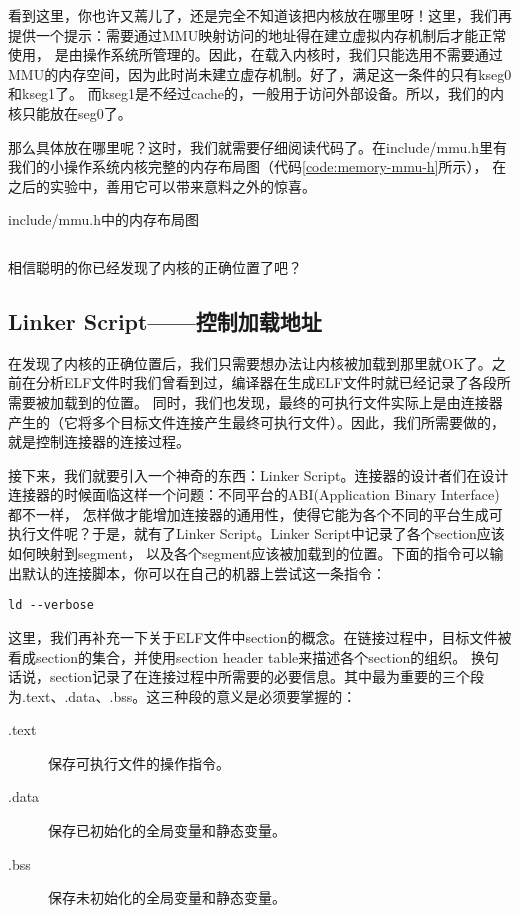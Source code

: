 看到这里，你也许又蔫儿了，还是完全不知道该把内核放在哪里呀！这里，我们再提供一个提示：需要通过MMU映射访问的地址得在建立虚拟内存机制后才能正常使用，
是由操作系统所管理的。因此，在载入内核时，我们只能选用不需要通过MMU的内存空间，因为此时尚未建立虚存机制。好了，满足这一条件的只有kseg0和kseg1了。
而kseg1是不经过cache的，一般用于访问外部设备。所以，我们的内核只能放在seg0了。

那么具体放在哪里呢？这时，我们就需要仔细阅读代码了。在include/mmu.h里有我们的小操作系统内核完整的内存布局图（代码\ref{code:memory-mmu-h}所示），
在之后的实验中，善用它可以带来意料之外的惊喜。

\begin{codeBoxWithCaption}{include/mmu.h中的内存布局图\label{code:memory-mmu-h}}
  \inputminted[linenos]{c}{codes/memory-mmu.h}
\end{codeBoxWithCaption}

相信聪明的你已经发现了内核的正确位置了吧？

\subsection{Linker Script——控制加载地址}
在发现了内核的正确位置后，我们只需要想办法让内核被加载到那里就OK了。之前在分析ELF文件时我们曾看到过，编译器在生成ELF文件时就已经记录了各段所需要被加载到的位置。
同时，我们也发现，最终的可执行文件实际上是由连接器产生的（它将多个目标文件连接产生最终可执行文件）。因此，我们所需要做的，就是控制连接器的连接过程。

接下来，我们就要引入一个神奇的东西：Linker Script。连接器的设计者们在设计连接器的时候面临这样一个问题：不同平台的ABI(Application Binary Interface)都不一样，
怎样做才能增加连接器的通用性，使得它能为各个不同的平台生成可执行文件呢？于是，就有了Linker Script。Linker Script中记录了各个section应该如何映射到segment，
以及各个segment应该被加载到的位置。下面的指令可以输出默认的连接脚本，你可以在自己的机器上尝试这一条指令：

\begin{verbatim}
ld --verbose
\end{verbatim}

这里，我们再补充一下关于ELF文件中section的概念。在链接过程中，目标文件被看成section的集合，并使用section header table来描述各个section的组织。
换句话说，section记录了在连接过程中所需要的必要信息。其中最为重要的三个段为.text、.data、.bss。这三种段的意义是必须要掌握的：

\begin{description}
  \item[.text] 保存可执行文件的操作指令。
  \item[.data] 保存已初始化的全局变量和静态变量。
  \item[.bss] 保存未初始化的全局变量和静态变量。
\end{description}


